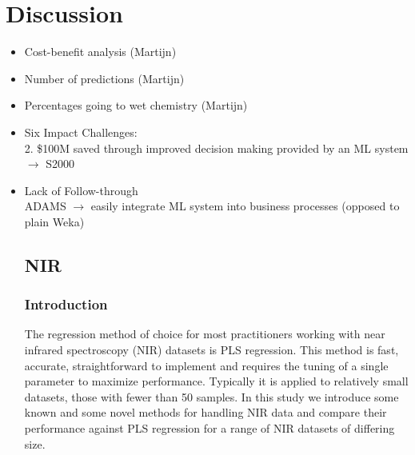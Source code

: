 \documentclass{llncs}
\begin{document}
\section{Discussion}
\begin{itemize}
  \item Cost-benefit analysis (Martijn)
  \item Number of predictions (Martijn)
  \item Percentages going to wet chemistry (Martijn)
  \item Six Impact Challenges: \\
    2. \$100M saved through improved decision making provided by an ML system $\rightarrow$ S2000
  \item Lack of Follow-through \\
	ADAMS $\rightarrow$ easily integrate ML system into business processes (opposed to plain Weka)

\subsection{NIR}
\subsubsection{Introduction}
The regression method of choice for most practitioners working with near infrared spectroscopy (NIR) datasets is PLS regression. This method is fast, accurate, straightforward to implement and requires the tuning of a single parameter to maximize performance. Typically it is applied to relatively small datasets, those with fewer than 50 samples. In this study we introduce some known and some novel methods for handling NIR data and compare their performance against PLS regression for a range of NIR datasets of differing size.


\end{itemize}
\end{document}
